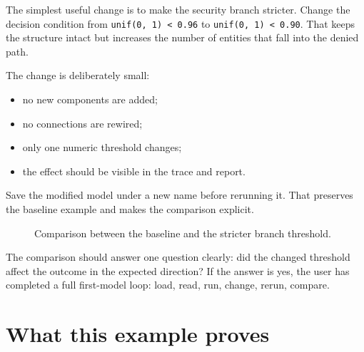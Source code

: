 The simplest useful change is to make the security branch stricter. Change the
decision condition from \texttt{unif(0, 1) < 0.96} to
\texttt{unif(0, 1) < 0.90}. That keeps the structure intact but increases the
number of entities that fall into the denied path.

The change is deliberately small:
\begin{itemize}
\item no new components are added;
\item no connections are rewired;
\item only one numeric threshold changes;
\item the effect should be visible in the trace and report.
\end{itemize}

Save the modified model under a new name before rerunning it. That preserves
the baseline example and makes the comparison explicit.

\begin{figure}[htbp]
\centering
\caption{Comparison between the baseline and the stricter branch threshold.}
\label{fig:first-model-comparison}
\end{figure}

The comparison should answer one question clearly: did the changed threshold
affect the outcome in the expected direction? If the answer is yes, the user
has completed a full first-model loop:
load, read, run, change, rerun, compare.

\section{What this example proves}
\label{sec:first-model-what-it-proves}

